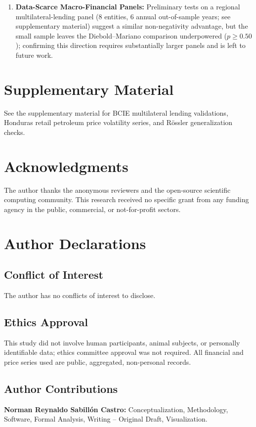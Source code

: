 \documentclass[aip,cha,reprint,amsmath,amssymb]{revtex4-2}
\begin{document}
\begin{enumerate}
    \item \textbf{Data-Scarce Macro-Financial Panels:} Preliminary tests on a regional multilateral-lending panel (8 entities, 6 annual out-of-sample years; see supplementary material) suggest a similar non-negativity advantage, but the small sample leaves the Diebold--Mariano comparison underpowered ($p \ge 0.50$); confirming this direction requires substantially larger panels and is left to future work.
\end{enumerate}

\section*{Supplementary Material}
See the supplementary material for BCIE multilateral lending validations, Honduras retail petroleum price volatility series, and R\"ossler generalization checks.

\section*{Acknowledgments}
The author thanks the anonymous reviewers and the open-source scientific computing community. This research received no specific grant from any funding agency in the public, commercial, or not-for-profit sectors.

\section*{Author Declarations}
\subsection*{Conflict of Interest}
The author has no conflicts of interest to disclose.

\subsection*{Ethics Approval}
This study did not involve human participants, animal subjects, or personally identifiable data; ethics committee approval was not required. All financial and price series used are public, aggregated, non-personal records.

\subsection*{Author Contributions}
\textbf{Norman Reynaldo Sabill{\'o}n Castro:} Conceptualization, Methodology, Software, Formal Analysis, Writing -- Original Draft, Visualization.
\end{document}
